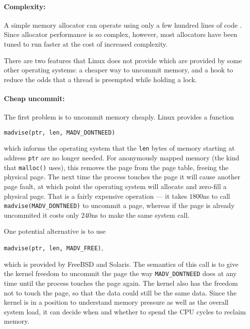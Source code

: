 \documentclass[pldi]{sigplanconf-pldi15}
\newcommand{\code}[1]{\texttt{#1}}
\begin{document}
{\paragraph{Complexity:}} A simple memory allocator can operate using
only a few hundred lines of code \cite{KernighanRi88}.  Since
allocator performance is so complex, however, most allocators have
been tuned to run faster at the cost of increased complexity.  





There are two features that Linux does not provide which are provided
by some other operating systems: a cheaper way to uncommit memory, and
a hook to reduce the odds that a thread is preempted while holding a
lock.

{\paragraph{Cheap uncommit:}} The first problem is to uncommit memory
cheaply.  Linux provides a function
\begin{center}
\code{madvise(ptr, len, MADV_DONTNEED)}
\end{center}
which informs the operating system that the \code{len} bytes of memory
starting at address \code{ptr} are no longer needed.  For anonymously
mapped memory (the kind that \code{malloc()} uses), this removes the
page from the page table, freeing the physical page.  The next time
the process touches the page it will cause another page fault, at
which point the operating system will allocate and zero-fill a
physical page.  That is a fairly expensive operation --- it takes
$1800$ns to call \code{madvise(MADV_DONTNEED)} to uncommit a page,
whereas if the page is already uncommited it costs only $240$ns to
make the same system call.

One potential alternative is to use
\begin{center}
\code{madvise(ptr, len, MADV_FREE)},
\end{center}
which is provided by FreeBSD and Solaris.  The semantics of this call
is to give the kernel freedom to uncommit the page the way
\code{MADV_DONTNEED} does at any time until the process touches the
page again.  The kernel also has the freedom not to touch the page, so
that the data could still be the same data.  Since the kernel is in a
position to understand memory pressure as well as the overall system
load, it can decide when and whether to spend the CPU cycles to
reclaim memory.
\end{document}
